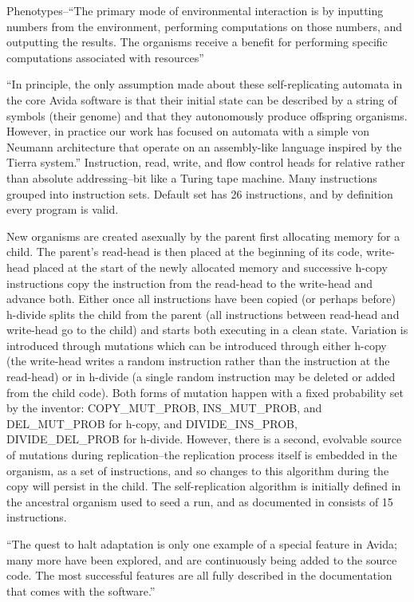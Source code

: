 \begin{NOTES}
Phenotypes--``The primary mode of environmental interaction is by inputting numbers from the environment, performing computations on those numbers, and outputting the results. The organisms receive a benefit for performing specific computations associated with resources''

``In principle, the only assumption made about these self-replicating automata in the core Avida software is that their initial state can be described by a string of symbols (their genome) and that they autonomously produce offspring organisms. However, in practice our work has focused on automata with a simple von Neumann architecture that operate on an assembly-like language inspired by the Tierra system.''
Instruction, read, write, and flow control heads for relative rather than absolute addressing--bit like a Turing tape machine. Many instructions grouped into instruction sets. Default set has 26 instructions, and by definition every program is valid.

New organisms are created asexually by the parent first allocating memory for a child. The parent's read-head is then placed at the beginning of its code, write-head placed at the start of the newly allocated memory and successive h-copy instructions copy the instruction from the read-head to the write-head and advance both. Either once all instructions have been copied (or perhaps before) h-divide splits the child from the parent (all instructions between read-head and write-head go to the child) and starts both executing in a clean state. Variation is introduced through mutations which can be introduced through either h-copy (the write-head writes a random instruction rather than the instruction at the read-head) or in h-divide (a single random instruction may be deleted or added from the child code). Both forms of mutation happen with a fixed probability set by the inventor: COPY\_MUT\_PROB, INS\_MUT\_PROB, and DEL\_MUT\_PROB for h-copy, and DIVIDE\_INS\_PROB, DIVIDE\_DEL\_PROB for h-divide. However, there is a second, evolvable source of mutations during replication--the replication process itself is embedded in the organism, as a set of instructions, and so changes to this algorithm during the copy will persist in the child. The self-replication algorithm is initially defined in the ancestral organism used to seed a run, and as documented in \cite[A1.3]{Ofria2004} consists of 15 instructions.

``The quest to halt adaptation is only one example of a special feature in Avida; many more have been explored, and are continuously being added to the source code. The most successful features are all fully described in the documentation that comes with the software.''


\end{NOTES}
